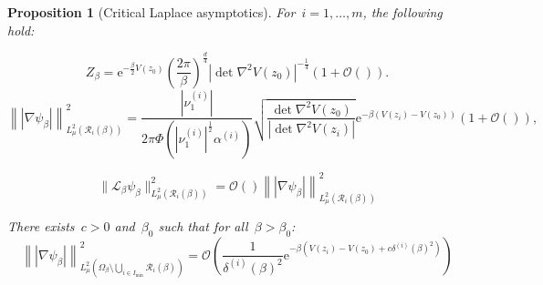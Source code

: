 \documentclass[10pt]{article}
\newcommand{\cL}{\mathcal{L}}
\newcommand{\e}{\mathrm{e}}
\newcommand{\1}{\mathbbm 1}
\newcommand{\deltaRadius}[1]{\delta^{(#1)}} %
\newcommand{\epsLimit}[1]{\alpha^{(#1)}} %
\newcommand{\localCuboid}[1]{\mathcal R_{#1}}
\newcommand{\hessEigval}[2]{\nu^{(#1)}_{#2}} %
\renewcommand{\O}{\mathcal{O}}
\newtheorem{proposition}{Proposition}
\begin{document}
        \begin{proposition}[Critical Laplace asymptotics]
            For~$i=1,\dots,m$, the following hold:

            \begin{equation}
                \label{eq:laplace_a}
                Z_\beta = \e^{-\frac{\beta}2 V(z_0)} \left(\frac{2\pi}{\beta}\right)^{\frac d4}|\det \nabla^2 V(z_0)|^{-\frac14}\left(1+\O()\right).
            \end{equation}
            \begin{equation}
                \label{eq:laplace_b}
                \left\||\nabla \psi_\beta|\right\|^2_{L_\mu^2(\localCuboid{i}(\beta))} = \frac{|\hessEigval{i}{1}|}{2\pi\Phi\left(|\hessEigval{i}{1}|^{\frac12}\epsLimit{i}\right)}\sqrt{\frac{\det \nabla^2 V(z_0)}{\left|\det \nabla ^2 V(z_i)\right|}} \e^{-\beta(V(z_i)-V(z_0))} \left(1 +\O()\right),
            \end{equation}

            \begin{equation}
                \label{eq:laplace_c}
                \|\cL_\beta \psi_\beta\|^2_{L^2_\mu(\localCuboid{i}(\beta))} = \O()\left\||\nabla\psi_\beta|\right\|^2_{L^2_\mu(\localCuboid{i}(\beta))}
            \end{equation}


            There exists~$c>0$ and~$\beta_0$ such that for all~$\beta>\beta_0$:
            \begin{equation}
                \label{eq:laplace_d}
                \left\||\nabla\psi_\beta|\right\|^2_{L_\mu^2(\Omega_\beta \setminus \bigcup_{i\in I_{\min}}\localCuboid{i}(\beta))} = \O\left(\frac1{\deltaRadius{i}(\beta)^2} \e^{-\beta(V(z_i)-V(z_0)+c\deltaRadius{i}(\beta)^2)}\right)
            \end{equation}

        \end{proposition}
\end{document}
